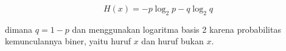\begin{displaymath}
	H(x) = -p\log_2 p - q\log_2 q
\end{displaymath}

\noindent dimana \begin{math}q = 1-p\end{math} dan menggunakan logaritma basis 2 karena probabilitas kemunculannya biner, yaitu huruf \begin{math}x\end{math} dan huruf bukan \begin{math}x\end{math}.